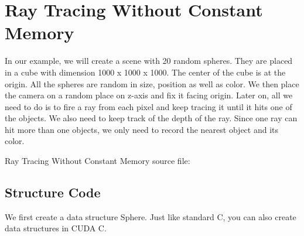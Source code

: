 \documentclass[letterpaper,10pt,english]{sphinxmanual}
\begin{document}
\section{Ray Tracing Without Constant Memory}
\label{RTACM/RTACM:ray-tracing-without-constant-memory}
In our example, we will create a scene with 20 random spheres. They are placed in a cube with dimension 1000 x 1000 x 1000. The center of the cube is at the origin. All the spheres are random in size, position as well as color. We then place the camera on a random place on z-axis and fix it facing origin. Later on, all we need to do is to fire a ray from each pixel and keep tracing it until it hits one of the objects. We also need to keep track of the depth of the ray. Since one ray can hit more than one objects, we only need to record the nearest object and its color.

Ray Tracing Without Constant Memory source file:


\subsection{Structure Code}
\label{RTACM/RTACM:structure-code}
We first create a data structure Sphere. Just like standard C, you can also create data structures in CUDA C.
\end{document}
